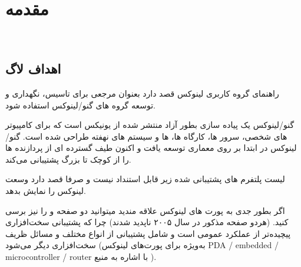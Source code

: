 
\section{مقدمه}
‍‍‍‍‍	
\subsection{اهداف لاگ}

راهنمای گروه کاربری لینوکس قصد دارد بعنوان مرجعی برای تاسیس، نگهداری و توسعه گروه های گنو/لینوکس استفاده شود.

گنو/لینوکس یک پیاده سازی بطور آزاد منتشر شده از یونیکس است که برای کامپیوتر های شخصی، سرور ها، کارگاه ها،  ها و سیستم های نهفته طراحی شده است. گنو/لینوکس در ابتدا بر روی معماری  توسعه یافت و اکنون طیف گسترده ای از پردازنده ها را از کوچک تا بزرگ پشتیبانی می‌کند.

\begin{note}
لیست پلتفرم های پشتیبانی شده زیر قابل استنداد نیست و صرفا قصد دارد وسعت لینوکس را نمایش بدهد.
\end{note}


اگر بطور جدی به پورت های لینوکس علاقه مندید میتوانید دو صفحه
و
را نیز برسی کنید.  (هردو صفحه مذکور در سال ۲۰۰۵ ناپدید شدند)
چرا که پشتیبانی سخت‌افزاری پیچیده‌تر از عملکرد عمومی  است و شامل پشتیبانی از انواع مختلف  و مسائل ظریف سخت‌افزاری دیگر می‌شود (به‌ویژه برای پورت‌های لینوکس PDA / embedded / microcontroller / router با اشاره به منبع
).



